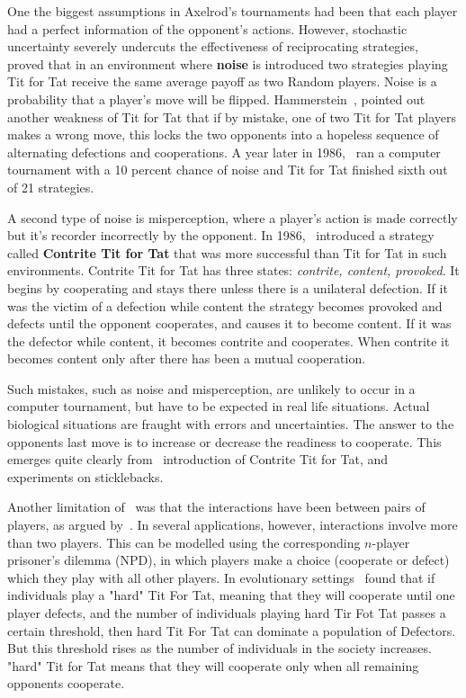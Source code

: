 \documentclass{article}
\theoremstyle{definition}
\begin{document}
One the biggest assumptions in Axelrod's tournaments had been that each player had a perfect
information of the opponent's actions. However, stochastic uncertainty severely undercuts
the effectiveness of reciprocating strategies,~\cite{Molander1985} proved that
in an environment where \textbf{noise} is introduced two strategies playing Tit
for Tat receive the same average payoff as two Random players.
Noise is a probability that a player's move will be
flipped. Hammerstein~\cite{Hammerstein1984}, pointed out another weakness of Tit
for Tat that if by mistake, one of two Tit for Tat players makes a wrong move,
this locks the two opponents into a hopeless sequence of alternating defections
and cooperations. A year later in 1986,~\cite{Donninger1986} ran a computer tournament with a
10 percent chance of noise and Tit for Tat finished sixth out of
21 strategies.

A second type of noise is misperception, where a player's action
is made correctly but it's recorder incorrectly by the opponent. In 1986,~\cite{Sugden2004}
introduced a strategy called
\textbf{Contrite Tit for Tat} that was more successful than Tit for Tat in such environments.
Contrite Tit for Tat has three states:
\textit{contrite, content, provoked}. It begins by cooperating and stays there unless
there is a unilateral defection. If it was the victim of a defection while content
the strategy becomes provoked and defects until the opponent cooperates, and 
causes it to become content. If it was the defector while content, it
becomes contrite and cooperates. When contrite it becomes content only after
there has been a mutual cooperation.

Such mistakes, such as noise and misperception, are unlikely to occur in a computer
tournament, but have to be expected
in real life situations. Actual biological situations are fraught with errors and uncertainties. The
answer to the opponents last move is to increase or decrease the readiness to cooperate.
This emerges quite clearly from~\cite{Sugden2004} introduction of Contrite Tit for Tat,
and~\cite{Milinski1987} experiments on sticklebacks.

Another limitation of~\cite{axelrod1981} was that the
interactions have been between pairs of players, as argued by~\cite{Joshi1987}.
In several applications, however, interactions involve more
than two players. This can be modelled using the corresponding \(n\)-player prisoner's
dilemma (NPD), in which players make a choice (cooperate or defect) which they play
with all other players. In evolutionary settings~\cite{Joshi1987} found that if
individuals play a "hard" Tit For Tat, meaning that they will cooperate until one
player defects, and the number of individuals playing hard Tir Fot Tat passes a
certain threshold, then hard Tit For Tat can dominate a population of Defectors.
But this threshold rises as the number of individuals in the society increases.
"hard" Tit for Tat means that they will cooperate only when all remaining opponents
cooperate.
\end{document}
